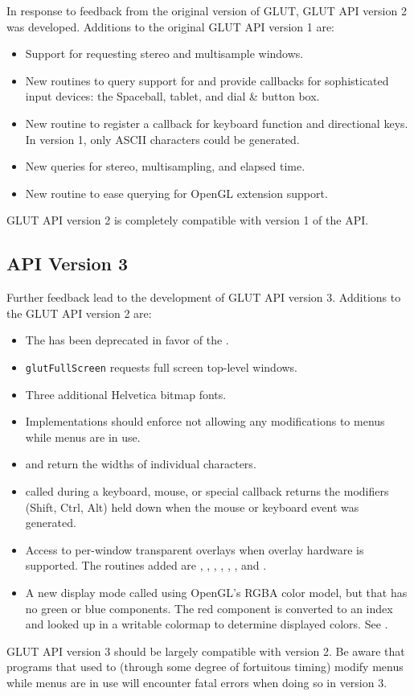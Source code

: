 \documentclass[titlepage,twoside]{article}
\begin{document}
In response to feedback from the original version of GLUT, GLUT API version
2 was developed.  Additions to the original GLUT API version 1 are:
\begin{itemize}
\item Support for requesting stereo and multisample windows.
\item New routines to query support for and provide callbacks for sophisticated
      input devices: the Spaceball, tablet, and dial \& button box.
\item New routine to register a callback for keyboard function and directional
      keys.  In version 1, only ASCII characters could be generated.
\item New queries for stereo, multisampling, and elapsed time.
\item New routine to ease querying for OpenGL extension support.
\end{itemize}
GLUT API version 2 is completely compatible with version 1 of the API.

\subsection{API Version 3}

Further feedback lead to the development of GLUT API version 3.
Additions to the GLUT API version 2 are:
\begin{itemize}
\item The  has been deprecated in favor of the
      .
\item {\tt glutFullScreen} requests full screen top-level windows.
\item Three additional Helvetica bitmap fonts.
\item Implementations should enforce not allowing any modifications
      to menus while menus are in use.
\item {} and  return the
      widths of individual characters.
\item {} called during a keyboard, mouse, or special
      callback returns the modifiers (Shift, Ctrl, Alt)
      held down when the mouse or keyboard event was generated.
\item Access to per-window transparent overlays when overlay hardware
      is supported.  The routines added are ,
      , ,
      , , ,
      and .
\item A new display mode called  using OpenGL's
      RGBA color model, but that has no green or blue components.  The red
      component is converted to an index and looked up in a writable
      colormap to determine displayed colors.  See .

\end{itemize}
GLUT API version 3 should be largely compatible with version 2.  Be
aware that programs that used to (through some degree of fortuitous
timing) modify menus while menus are in use will encounter fatal errors
when doing so in version 3.
\end{document}
